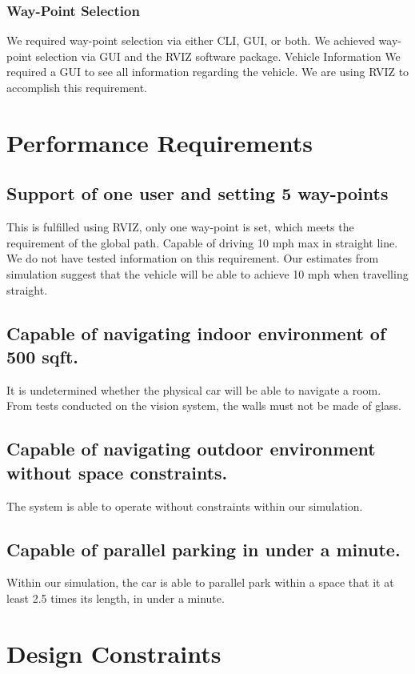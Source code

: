 \documentclass[compsoc,draftclsnofoot,onecolumn,10pt]{IEEEtran}
\begin{document}
\subsubsection{Way-Point Selection}
We required way-point selection via either CLI, GUI, or both. We achieved way-point selection via GUI and the RVIZ software package.
Vehicle Information
We required a GUI to see all information regarding the vehicle. We are using RVIZ to accomplish this requirement.


\section{Performance Requirements}
\subsection{Support of one user and setting 5 way-points}
This is fulfilled using RVIZ, only one way-point is set, which meets the requirement of the global path.
Capable of driving 10 mph max in straight line.
We do not have tested information on this requirement. Our estimates from simulation suggest that the vehicle will be able to achieve 10 mph when travelling straight.

\subsection{Capable of navigating indoor environment of 500 sqft.}
It is undetermined whether the physical car will be able to navigate a room. From tests conducted on the vision system, the walls must not be made of glass.

\subsection{Capable of navigating outdoor environment without space constraints.}
The system is able to operate without constraints within our simulation.

\subsection{Capable of parallel parking in under a minute.}
Within our simulation, the car is able to parallel park within a space that it at least 2.5 times its length, in under a minute.


\section{Design Constraints}
\end{document}
